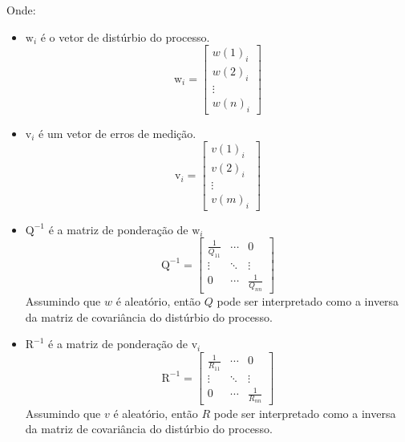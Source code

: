 \noindent
Onde: 
\begin{itemize}
	\item $\mathrm{w}_i$ é o vetor de distúrbio do processo.
		\begin{equation}
			\mathrm{w}_i =
			\begin{bmatrix}
				w(1)_{i} \\
				w(2)_{i} \\
				\vdots \\
				w(n)_{i}
			\end{bmatrix}
		\end{equation}
		
	\item $\mathrm{v}_i$ é um vetor de erros de medição.
		\begin{equation}
			\mathrm{v}_i =
			\begin{bmatrix}
				v(1)_{i} \\
				v(2)_{i} \\
				\vdots \\
				v(m)_{i}
			\end{bmatrix}
		\end{equation}
		
	\item $\mathrm{Q}^{-1}$ é a matriz de ponderação de $\mathrm{w}_i$
		\begin{equation}
			\mathrm{Q}^{-1} =
			\begin{bmatrix}
				\frac{1}{Q_{11}} & \cdots & 0 \\
				\vdots & \ddots & \vdots \\
				0 & \cdots & \frac{1}{Q_{nn}}
			\end{bmatrix}
		\end{equation}
		Assumindo que $w$ é aleatório, então $Q$ pode ser interpretado como a inversa
		da matriz de covariância do distúrbio do processo.

	\item $\mathrm{R}^{-1}$ é a matriz de ponderação de $\mathrm{v}_i$
		\begin{equation}
			\mathrm{R}^{-1} =
			\begin{bmatrix}
				\frac{1}{R_{11}} & \cdots & 0 \\
				\vdots & \ddots & \vdots \\
				0 & \cdots & \frac{1}{R_{nn}}
			\end{bmatrix}
		\end{equation}
		Assumindo que $v$ é aleatório, então $R$ pode ser interpretado como a inversa
		da matriz de covariância do distúrbio do processo.
	
\end{itemize}

